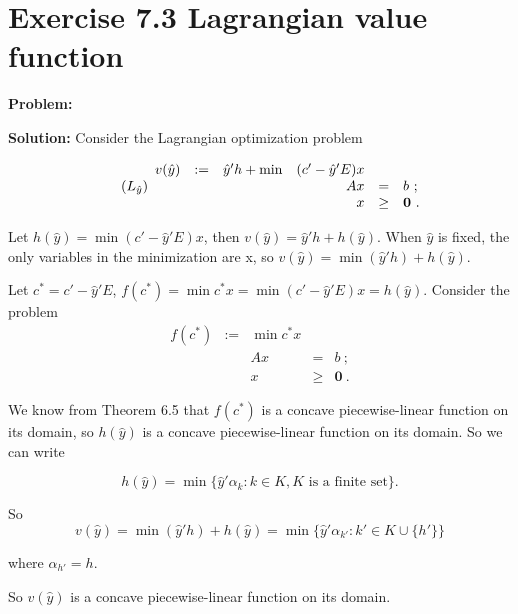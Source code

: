 \section{Exercise 7.3 Lagrangian value function}
\textbf{Problem:} 

\textbf{Solution:} Consider the Lagrangian optimization problem

\[
\tag{$L_{\hat{y}}$}
\begin{array}{ccrrcl}
v(\hat{y}) & := & \hat{y}'h + \min & (c'-\hat{y}'E)x  &      &   \\
   &&   &  Ax  &   =  & b~; \\
   &&   &   x  & \geq & \mathbf{0}~.
\end{array}
\]

Let $h(\hat{y}) = \min (c'-\hat{y}'E)x $, then $v(\hat{y}) = \hat{y}'h + h(\hat{y})$. When $\hat{y}$ is fixed, the only variables in the minimization are x, so $v(\hat{y})=\min(\hat{y}'h) + h(\hat{y})$.

Let $c^* = c'-\hat{y}'E$, $f(c^*) = \min c^* x = \min (c'-\hat{y}'E)x = h(\hat{y})$. Consider the problem
\[
\begin{array}{ccrrcl}
f(c^*) & := &\min c^*x  &      &   \\
   &&    Ax  &   =  & b~; \\
   &&     x  & \geq & \mathbf{0}~.
\end{array}
\]

We know from Theorem 6.5 that $f(c^*)$ is a concave piecewise-linear function on its domain, so $h(\hat{y})$ is a concave piecewise-linear function on its domain. So we can write

$$h(\hat{y}) = \min\{ \hat{y}'\alpha_k:k\in K, K \text{~is a finite set}\}.$$

So
$$ v(\hat{y})= \min (\hat{y}'h) + h(\hat{y}) = \min \{\hat{y}'\alpha_{k'}:k'\in K\cup \{h'\}\}$$

where $\alpha_{h'}=h$.

So $v(\hat{y})$ is a concave piecewise-linear function on its domain.